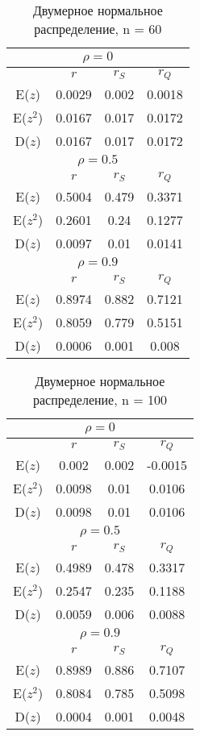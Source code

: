\documentclass[a4paper,12pt]{article} %
\begin{document}
\begin{table}[H]
    \centering
    \begin{tabular}{|c|c|c|c|}
\hline
\multicolumn{4}{|c|}{$\rho=0$}\\
\hline
&$r$&$r_S$&$r_Q$\\
\hline
E($z$)&0.0029&0.002&0.0018\\
\hline
E($z^2$)&0.0167&0.017&0.0172\\
\hline
D($z$)&0.0167&0.017&0.0172\\
\hline
\multicolumn{4}{|c|}{$\rho=0.5$}\\
\hline
&$r$&$r_S$&$r_Q$\\
\hline
E($z$)&0.5004&0.479&0.3371\\
\hline
E($z^2$)&0.2601&0.24&0.1277\\
\hline
D($z$)&0.0097&0.01&0.0141\\
\hline
\multicolumn{4}{|c|}{$\rho=0.9$}\\
\hline
&$r$&$r_S$&$r_Q$\\
\hline
E($z$)&0.8974&0.882&0.7121\\
\hline
E($z^2$)&0.8059&0.779&0.5151\\
\hline
D($z$)&0.0006&0.001&0.008\\
\hline
\end{tabular}
    \caption{Двумерное нормальное распределение, n = 60}
    \label{tab:norm_n_60}
\end{table}
\begin{table}[H]
    \centering
\begin{tabular}{|c|c|c|c|}
\hline
\multicolumn{4}{|c|}{$\rho=0$}\\
\hline
&$r$&$r_S$&$r_Q$\\
\hline
E($z$)&0.002&0.002&-0.0015\\
\hline
E($z^2$)&0.0098&0.01&0.0106\\
\hline
D($z$)&0.0098&0.01&0.0106\\
\hline
\multicolumn{4}{|c|}{$\rho=0.5$}\\
\hline
&$r$&$r_S$&$r_Q$\\
\hline
E($z$)&0.4989&0.478&0.3317\\
\hline
E($z^2$)&0.2547&0.235&0.1188\\
\hline
D($z$)&0.0059&0.006&0.0088\\
\hline
\multicolumn{4}{|c|}{$\rho=0.9$}\\
\hline
&$r$&$r_S$&$r_Q$\\
\hline
E($z$)&0.8989&0.886&0.7107\\
\hline
E($z^2$)&0.8084&0.785&0.5098\\
\hline
D($z$)&0.0004&0.001&0.0048\\
\hline
\end{tabular}
    \caption{Двумерное нормальное распределение, n = 100}
    \label{tab:norm_n_100}
\end{table}
\end{document}
